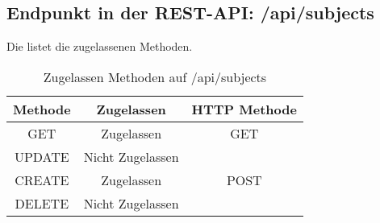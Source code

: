 \subsection{Endpunkt in der REST-API: /api/subjects}
Die  listet die zugelassenen Methoden. 

\begin{table}[!htbp]
	\begin{tabular}{|c|c|c|}
		\hline
			\textbf{Methode} & \textbf{Zugelassen} & \textbf{HTTP Methode} \\ \hline
			GET & Zugelassen & GET \\ \hline
			UPDATE & Nicht Zugelassen & \\ \hline 
			CREATE & Zugelassen & POST \\ \hline 
			DELETE & Nicht Zugelassen & \\ \hline
	\end{tabular}

		\caption{Zugelassen Methoden auf /api/subjects}
		\label{tab:end:rest:api:subjects:meth}
\end{table}